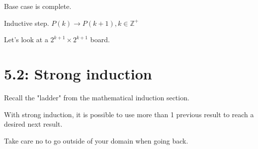 \documentclass{exam}
\begin{document}
    
    Base case is complete.
    
    Inductive step. $P(k) \rightarrow P(k+1), k \in \mathbb Z^+$
    
    Let's look at a $2^{k+1} \times 2^{k+1}$ board.
    
    
    \newpage
    
    \section{5.2: Strong induction}
    
    Recall the "ladder" from the mathematical induction section.
    
    With strong induction, it is possible to use more than 1 previous result to reach a desired next result.
    
    Take care no to go outside of your domain when going back.
    
\end{document}
